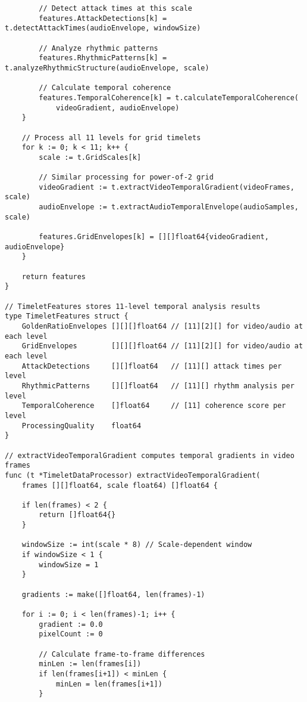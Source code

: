 \begin{tcolorbox}[colback=CodeBackground, colframe=DarkGray, title=Parallel Feature Extraction, fonttitle=\bfseries]
\begin{verbatim}
        // Detect attack times at this scale
        features.AttackDetections[k] = t.detectAttackTimes(audioEnvelope, windowSize)
        
        // Analyze rhythmic patterns
        features.RhythmicPatterns[k] = t.analyzeRhythmicStructure(audioEnvelope, scale)
        
        // Calculate temporal coherence
        features.TemporalCoherence[k] = t.calculateTemporalCoherence(
            videoGradient, audioEnvelope)
    }
    
    // Process all 11 levels for grid timelets
    for k := 0; k < 11; k++ {
        scale := t.GridScales[k]
        
        // Similar processing for power-of-2 grid
        videoGradient := t.extractVideoTemporalGradient(videoFrames, scale)
        audioEnvelope := t.extractAudioTemporalEnvelope(audioSamples, scale)
        
        features.GridEnvelopes[k] = [][]float64{videoGradient, audioEnvelope}
    }
    
    return features
}

// TimeletFeatures stores 11-level temporal analysis results
type TimeletFeatures struct {
    GoldenRatioEnvelopes [][][]float64 // [11][2][] for video/audio at each level
    GridEnvelopes        [][][]float64 // [11][2][] for video/audio at each level
    AttackDetections     [][]float64   // [11][] attack times per level
    RhythmicPatterns     [][]float64   // [11][] rhythm analysis per level
    TemporalCoherence    []float64     // [11] coherence score per level
    ProcessingQuality    float64
}

// extractVideoTemporalGradient computes temporal gradients in video frames
func (t *TimeletDataProcessor) extractVideoTemporalGradient(
    frames [][]float64, scale float64) []float64 {
    
    if len(frames) < 2 {
        return []float64{}
    }
    
    windowSize := int(scale * 8) // Scale-dependent window
    if windowSize < 1 {
        windowSize = 1
    }
    
    gradients := make([]float64, len(frames)-1)
    
    for i := 0; i < len(frames)-1; i++ {
        gradient := 0.0
        pixelCount := 0
        
        // Calculate frame-to-frame differences
        minLen := len(frames[i])
        if len(frames[i+1]) < minLen {
            minLen = len(frames[i+1])
        }
        

\end{verbatim}
\end{tcolorbox}
